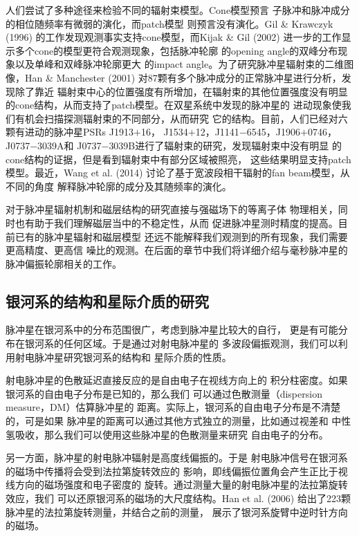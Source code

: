 人们尝试了多种途径来检验不同的辐射束模型。Cone模型预言
子脉冲和脉冲成分的相位随频率有微弱的演化，而patch模型
则预言没有演化\supercite{gk96,kg02}。Gil \& Krawczyk (1996)\supercite{gk96}
的工作发现观测事实支持cone模型，而Kijak \& Gil (2002)\supercite{kg02}
进一步的工作显示多个cone的模型更符合观测现象，包括脉冲轮廓
的opening angle的双峰分布现象以及单峰和双峰脉冲轮廓更大
的impact angle。为了研究脉冲星辐射束的二维图像，Han \& Manchester (2001)\supercite{Han01}
对87颗有多个脉冲成分的正常脉冲星进行分析，发现除了靠近
辐射束中心的位置强度有所增加，在辐射束的其他位置强度没有明显
的cone结构，从而支持了patch模型。在双星系统中发现的脉冲星的
进动现象使我们有机会扫描探测辐射束的不同部分，从而研究
它的结构。目前，人们已经对六颗有进动的脉冲星PSRs J1913$+$16，
J1534$+$12，J1141$-$6545，J1906$+$0746，J0737$-$3039A和
J0737$-$3039B进行了辐射束的研究\supercite{kra12}，发现辐射束中没有明显
的cone结构的证据，但是看到辐射束中有部分区域被照亮，
这些结果明显支持patch模型。最近，Wang et al. (2014)\supercite{Wang14}
讨论了基于宽波段相干辐射的fan beam模型，从不同的角度
解释脉冲轮廓的成分及其随频率的演化。

对于脉冲星辐射机制和磁层结构的研究直接与强磁场下的等离子体
物理相关，同时也有助于我们理解磁层当中的不稳定性，从而
促进脉冲星测时精度的提高。目前已有的脉冲星辐射和磁层模型
还远不能解释我们观测到的所有现象，我们需要更高精度、更高信
噪比的观测。在后面的章节中我们将详细介绍与毫秒脉冲星的
脉冲偏振轮廓相关的工作。

\subsection{银河系的结构和星际介质的研究}

脉冲星在银河系中的分布范围很广，考虑到脉冲星比较大的自行，
更是有可能分布在银河系的任何区域。于是通过对射电脉冲星的
多波段偏振观测，我们可以利用射电脉冲星研究银河系的结构和
星际介质的性质。

射电脉冲星的色散延迟直接反应的是自由电子在视线方向上的
积分柱密度。如果银河系的自由电子分布是已知的，那么我们
可以通过色散测量（dispersion measure，DM）估算脉冲星的
距离。实际上，银河系的自由电子分布是不清楚的，可是如果
脉冲星的距离可以通过其他方式独立的测量，比如通过视差和
中性氢吸收，那么我们可以使用这些脉冲星的色散测量来研究
自由电子的分布\supercite{cordes}。

另一方面，脉冲星的射电脉冲辐射是高度线偏振的。于是
射电脉冲信号在银河系的磁场中传播将会受到法拉第旋转效应的
影响，即线偏振位置角会产生正比于视线方向的磁场强度和电子密度的
旋转。通过测量大量的射电脉冲星的法拉第旋转效应，我们
可以还原银河系的磁场的大尺度结构。Han et al. (2006)\supercite{hml+06}
给出了223颗脉冲星的法拉第旋转测量，并结合之前的测量，
展示了银河系旋臂中逆时针方向的磁场。


